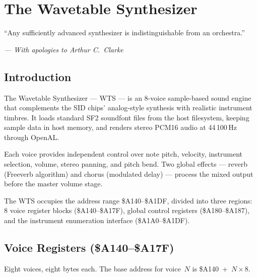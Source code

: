 \chapter{The Wavetable Synthesizer}

\epigraph{``Any sufficiently advanced synthesizer is indistinguishable from an
orchestra.''}{\textit{--- With apologies to Arthur C.\ Clarke}}

\section*{Introduction}

The Wavetable Synthesizer --- WTS --- is an 8-voice sample-based sound engine
that complements the SID chips' analog-style synthesis with realistic instrument
timbres.  It loads standard SF2 soundfont files from the host filesystem,
keeping sample data in host memory, and renders stereo PCM16 audio at
44\,100\,Hz through OpenAL.

Each voice provides independent control over note pitch, velocity, instrument
selection, volume, stereo panning, and pitch bend.  Two global effects ---
reverb (Freeverb algorithm) and chorus (modulated delay) --- process the mixed
output before the master volume stage.

The WTS occupies the address range \$A140--\$A1DF, divided into three regions:
8 voice register blocks (\$A140--\$A17F), global control registers
(\$A180--\$A187), and the instrument enumeration interface (\$A1A0--\$A1DF).


\section{Voice Registers (\$A140--\$A17F)}
\label{sec:wts-voices}

Eight voices, eight bytes each.  The base address for voice~$N$ is
\$A140~+~$N \times 8$.


